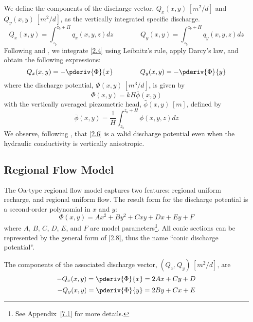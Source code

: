 \documentclass[12pt]{article}
\newcommand{\Oneka}{{\textsf{O\raisebox{-0.3ex}{n}\raisebox{0.3ex}{e}\raisebox{-0.3ex}{k}a}}}
\begin{document}
We define the components of the discharge vector, $Q_x(x,y)~[m^2/d]$ and $Q_y(x,y)~[m^2/d]$, as the vertically integrated specific discharge.
%
\begin{equation}\label{2.4}
    Q_x(x,y) = \int_{z_b}^{z_b+H} q_x(x,y,z) dz
	\qquad \qquad
    Q_y(x,y) = \int_{z_b}^{z_b+H} q_y(x,y,z) dz
\end{equation}
%
Following \citet[p. 77-78]{Bear79} and \citet{Strack06}, we integrate \eqref{2.4} using Leibnitz's rule, apply Darcy's law, and obtain the following expressions:
%
\begin{equation}\label{2.5}
    Q_x(x,y) = -\pderiv{\Phi}{x}
    \qquad\qquad
    Q_y(x,y) = -\pderiv{\Phi}{y}
\end{equation}
%
where the discharge potential, $\Phi(x,y)~[m^3/d]$, is given by
%
\begin{equation}\label{2.6}
    \Phi(x,y) = kH\bar{\phi}(x,y)
\end{equation}
%
with the vertically averaged piezometric head, $\bar{\phi}(x,y)~[m]$, defined by
%
\begin{equation}\label{2.7}
    \bar{\phi}(x,y) = \frac{1}{H} \int_{z_b}^{z_b+H} \phi(x,y,z) dz
\end{equation}
%
We observe, following \citet{Youngs66b}, that \eqref{2.6} is a valid discharge potential even when the hydraulic conductivity is vertically anisotropic.

\subsection{Regional Flow Model}
The \Oneka-type regional flow model captures two features: regional uniform recharge, and regional uniform flow.  The result form for the discharge potential is a second-order polynomial in $x$ and $y$:
%
\begin{equation} \label{2.8}
    \Phi(x,y) = Ax^2 + By^2 + Cxy + Dx + Ey + F
\end{equation}
%
where $A$, $B$, $C$, $D$, $E$, and $F$ are model parameters\footnote{See Appendix~\ref{7.1} for more details.}. All conic sections can be represented by the general form of \eqref{2.8}, thus the name ``conic discharge potential''.

The components of the associated discharge vector, $(Q_x,Q_y)~[m^2/d]$, are
%
\begin{equation} \label{2.9}
    -Q_x(x,y) = \pderiv{\Phi}{x} = 2Ax + Cy + D
\end{equation}
%
\begin{equation} \label{2.10}
    -Q_y(x,y) = \pderiv{\Phi}{y} = 2By + Cx + E
\end{equation}
\end{document}
